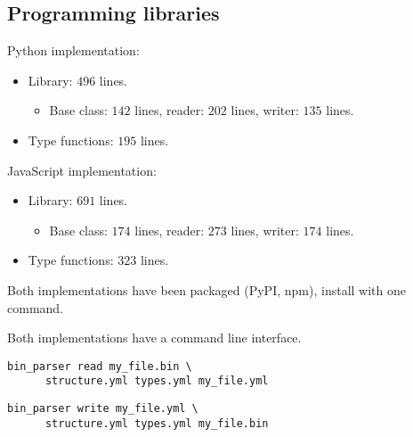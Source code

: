 \documentclass[slidestop]{beamer}
\begin{document}
\subsection{Programming libraries}
\begin{pframe}
  Python implementation:
  \begin{itemize}
    \item Library: $496$ lines.
    \begin{itemize}
      \item Base class: $142$ lines, reader: $202$ lines, writer: $135$ lines.
    \end{itemize}
    \item Type functions: $195$ lines.
  \end{itemize}
  \bigskip

  JavaScript implementation:
  \begin{itemize}
    \item Library: $691$ lines.
    \begin{itemize}
      \item Base class: $174$ lines, reader: $273$ lines, writer: $174$ lines.
    \end{itemize}
    \item Type functions: $323$ lines.
  \end{itemize}
  \bigskip
\end{pframe}

\begin{pframe}
  Both implementations have been packaged (PyPI, npm), install with one
  command.
  \bigskip

  Both implementations have a command line interface.
  \begin{lstlisting}[language=none, caption={Reader command line interface.}]
    bin_parser read my_file.bin \
      structure.yml types.yml my_file.yml
  \end{lstlisting}

  \begin{lstlisting}[language=none, caption={Writer command line interface.}]
    bin_parser write my_file.yml \
      structure.yml types.yml my_file.bin
  \end{lstlisting}
\end{pframe}
\end{document}
